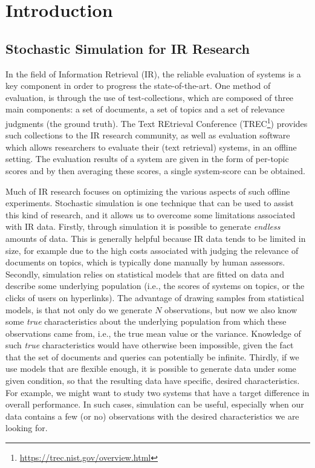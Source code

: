 \chapter{Introduction}

\section{Stochastic Simulation for IR Research}\label{1.1}

In the field of Information Retrieval (IR), the reliable evaluation of systems is a key component in order to progress the state-of-the-art. One method of evaluation, is through the use of test-collections, which are composed of three main components: a set of documents, a set of topics and a set of relevance judgments (the ground truth). The Text REtrieval Conference (TREC\footnote{\url{https://trec.nist.gov/overview.html}}) provides such collections to the IR research community, as well as evaluation software which allows researchers to evaluate their (text retrieval) systems, in an offline setting. The evaluation results of a system are given in the form of per-topic scores and by then averaging these scores, a single system-score can be obtained.

Much of IR research focuses on optimizing the various aspects of such offline experiments. Stochastic simulation is one technique that can be used to assist this kind of research, and it allows us to overcome some limitations associated with IR data. Firstly, through simulation it is possible to generate \textit{endless} amounts of data. This is generally helpful because IR data tends to be limited in size, for example due to the high costs associated with judging the relevance of documents on topics, which is typically done manually by human assessors. Secondly, simulation relies on statistical models that are fitted on data and describe some underlying population (i.e., the scores of systems on topics, or the clicks of users on hyperlinks). The advantage of drawing samples from statistical models, is that not only do we generate $N$ observations, but now we also know some \textit{true} characteristics about the underlying population from which these observations came from, i.e., the true mean value or the variance. Knowledge of such \textit{true} characteristics would have otherwise been impossible, given the fact that the set of documents and queries can potentially be infinite. Thirdly, if we use models that are flexible enough, it is possible to generate data under some given condition, so that the resulting data have specific, desired characteristics. For example, we might want to study two systems that have a target difference in overall performance. In such cases, simulation can be useful, especially when our data contains a few (or no) observations with the desired characteristics we are looking for.

